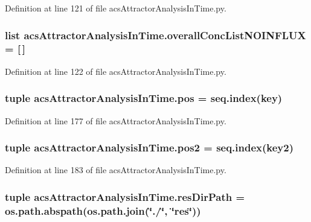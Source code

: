 Definition at line 121 of file acs\-Attractor\-Analysis\-In\-Time.\-py.

\hypertarget{a00091_ad7eab833592c6cd395f9e2416dd13920}{
\subsubsection[{overall\-Conc\-List\-N\-O\-I\-N\-F\-L\-U\-X}]{\setlength{\rightskip}{0pt plus 5cm}list acs\-Attractor\-Analysis\-In\-Time.\-overall\-Conc\-List\-N\-O\-I\-N\-F\-L\-U\-X = \mbox{[}$\,$\mbox{]}}}\label{a00091_ad7eab833592c6cd395f9e2416dd13920}


Definition at line 122 of file acs\-Attractor\-Analysis\-In\-Time.\-py.

\hypertarget{a00091_aa39692272363cd6f687c4b2a53f96594}{
\subsubsection[{pos}]{\setlength{\rightskip}{0pt plus 5cm}tuple acs\-Attractor\-Analysis\-In\-Time.\-pos = {\bf seq.\-index}(key)}}\label{a00091_aa39692272363cd6f687c4b2a53f96594}


Definition at line 177 of file acs\-Attractor\-Analysis\-In\-Time.\-py.

\hypertarget{a00091_a49fec7e1deea4728b5ef4a487d155de9}{
\subsubsection[{pos2}]{\setlength{\rightskip}{0pt plus 5cm}tuple acs\-Attractor\-Analysis\-In\-Time.\-pos2 = {\bf seq.\-index}(key2)}}\label{a00091_a49fec7e1deea4728b5ef4a487d155de9}


Definition at line 183 of file acs\-Attractor\-Analysis\-In\-Time.\-py.

\hypertarget{a00091_a28ca19f0f566396ef664e068a41a2837}{
\subsubsection[{res\-Dir\-Path}]{\setlength{\rightskip}{0pt plus 5cm}tuple acs\-Attractor\-Analysis\-In\-Time.\-res\-Dir\-Path = os.\-path.\-abspath(os.\-path.\-join(\char`\"{}./\char`\"{}, \char`\"{}res\char`\"{}))}}\label{a00091_a28ca19f0f566396ef664e068a41a2837}


